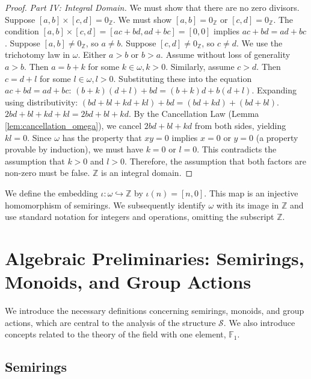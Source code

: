 \documentclass[11pt, a4paper]{article}
\theoremstyle{plain}
\theoremstyle{definition}
\numberwithin{equation}{section}
\newcommand{\Z}{\mathbb{Z}}
\newcommand{\SemiringS}{\mathcal{S}}
\newcommand{\FOne}{\mathbb{F}_1}
\begin{document}
\begin{proof}
\emph{Part IV: Integral Domain.}
We must show that there are no zero divisors. Suppose $[a, b]\times[c, d] = 0_{\Z}$. We must show $[a, b]=0_{\Z}$ or $[c, d]=0_{\Z}$.
The condition $[a, b]\times[c, d] = [ac+bd, ad+bc] = [0, 0]$ implies $ac+bd = ad+bc$.
Suppose $[a, b] \neq 0_{\Z}$, so $a \neq b$. Suppose $[c, d] \neq 0_{\Z}$, so $c \neq d$.
We use the trichotomy law in $\omega$. Either $a>b$ or $b>a$. Assume without loss of generality $a>b$. Then $a=b+k$ for some $k \in \omega, k>0$.
Similarly, assume $c>d$. Then $c=d+l$ for some $l \in \omega, l>0$.
Substituting these into the equation $ac+bd = ad+bc$:
$(b+k)(d+l)+bd = (b+k)d+b(d+l)$.
Expanding using distributivity:
$(bd+bl+kd+kl)+bd = (bd+kd)+(bd+bl)$.
$2bd+bl+kd+kl = 2bd+bl+kd$.
By the Cancellation Law (Lemma \ref{lem:cancellation_omega}), we cancel $2bd+bl+kd$ from both sides, yielding $kl=0$.
Since $\omega$ has the property that $xy=0$ implies $x=0$ or $y=0$ (a property provable by induction), we must have $k=0$ or $l=0$. This contradicts the assumption that $k>0$ and $l>0$.
Therefore, the assumption that both factors are non-zero must be false. $\Z$ is an integral domain.
\end{proof}

We define the embedding $\iota: \omega \hookrightarrow \Z$ by $\iota(n) = [n, 0]$. This map is an injective homomorphism of semirings. We subsequently identify $\omega$ with its image in $\Z$ and use standard notation for integers and operations, omitting the subscript $\Z$.

\section{Algebraic Preliminaries: Semirings, Monoids, and Group Actions}

We introduce the necessary definitions concerning semirings, monoids, and group actions, which are central to the analysis of the structure $\SemiringS$. We also introduce concepts related to the theory of the field with one element, $\FOne$.

\subsection{Semirings}
\end{document}
